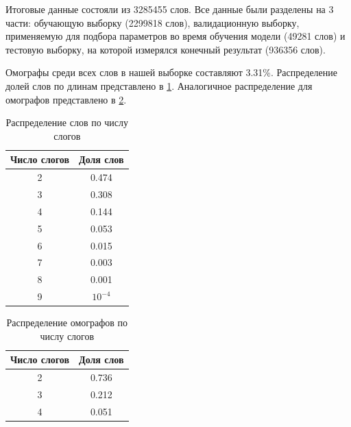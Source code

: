 \documentclass[14pt, a4paper, russian]{extreport}
\begin{document}
Итоговые данные состояли из 3285455  слов. Все данные были разделены на 3 части: обучающую выборку (2299818 слов), валидационную выборку, применяемую для подбора параметров во время обучения модели (49281 слов) и тестовую  выборку, на которой измерялся конечный результат (936356 слов).

Омографы среди всех слов в нашей выборке составляют 3.31\%. Распределение долей слов по длинам представлено в \cref{table:length_gen}. Аналогичное распределение для омографов представлено в \cref{table:length_homo}.

\begin{table}[H]
	\caption{Распределение слов по числу слогов}
	
	\begin{small}
		\begin{center}
			\begin{tabular}{|c|c|}
				\hline
				Число слогов & Доля слов \\ \hline
				     2       &   0.474   \\ \hline
				     3       &   0.308   \\ \hline
				     4       &   0.144   \\ \hline
				     5       &   0.053   \\ \hline
				     6       &   0.015   \\ \hline
				     7       &   0.003   \\ \hline
				     8       &   0.001   \\ \hline
				     9       & $10^{-4}$ \\ \hline
			\end{tabular}
			\end{center}
		\end{small}
	\label{table:length_gen}
\end{table}	
\begin{table}[H]
	\caption{Распределение омографов по числу слогов}
	
	\begin{small}
		\begin{center}
			\begin{tabular}{|c|c|}
				\hline
				Число слогов & Доля слов \\ \hline
				     2       &   0.736   \\ \hline
				     3       &   0.212   \\ \hline
				     4       &   0.051   \\ \hline
			\end{tabular}
		\end{center}
	\end{small}
	\label{table:length_homo}
\end{table}	
\end{document}

